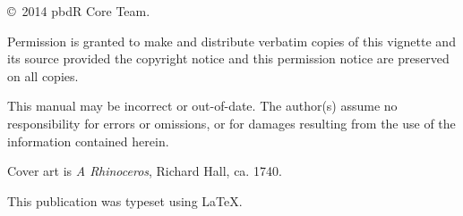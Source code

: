 \null
\vfill
\copyright\ 2014 pbdR Core Team.

Permission is granted to make and distribute verbatim copies of
this vignette and its source provided the copyright notice and
this permission notice are preserved on all copies.

This manual may be incorrect or out-of-date.  The author(s) assume
no responsibility for errors or omissions, or for damages resulting
from the use of the information contained herein.

Cover art is \textit{A Rhinoceros}, Richard Hall, ca. 1740.

This publication was typeset using \LaTeX.
